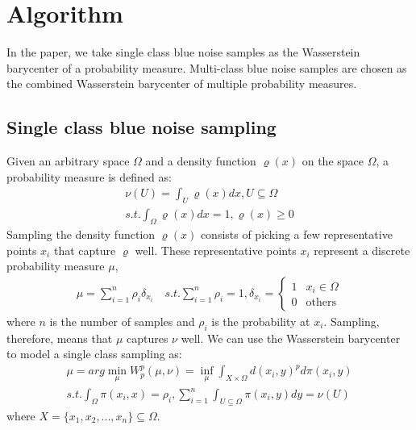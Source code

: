 \section{Algorithm}

In the paper,
we take single class blue noise samples  as the Wasserstein barycenter of a probability measure.
Multi-class blue noise samples are chosen as the combined Wasserstein barycenter of multiple probability measures.
\subsection{Single class blue noise sampling}
Given an arbitrary space $\Omega$ and a density function $\varrho(x)$ on the space $\Omega$,
a probability measure is defined as:
\begin{equation}\label{probability-measure}
  \begin{split}
  \nu(U)=\int_U\varrho(x)dx, U\subseteq\Omega \\
  s.t. \int_{\Omega}\varrho(x)dx=1,\varrho(x)\geq0
  \end{split}
\end{equation}
Sampling the density function $\varrho(x)$ consists of picking a few representative points $x_i$
that capture $\varrho$ well.
These representative points $x_i$ represent a discrete probability measure $\mu$,
\begin{equation*}
\begin{split}
  \mu=\sum\limits_{i=1}^n\rho_i\delta_{x_i} \quad
  s.t. \sum\limits_{i=1}^n\rho_i=1,  \delta_{x_i}= \left\{ \begin{array}{ll}
  1 & x_i\in\Omega\\
  0 & \textrm{others}
  \end{array} \right.
  \end{split}
\end{equation*}
where $n$ is the number of samples and
$\rho_i$ is the probability at $x_i$.
Sampling, therefore, means that $\mu$ captures $\nu$ well.
We can use the Wasserstein barycenter to model a single class sampling as:
\begin{equation}\label{single-class-problem}
\begin{split}
 \mu=arg\min\limits_\mu W_p^p(\mu,\nu)=\inf\limits_\mu\int_{X\times\Omega}d(x_i,y)^pd\pi(x_i,y)\\
 s.t. \int_\Omega\pi(x_i,x)=\rho_i, \sum\limits_{i=1}^n\int_{U\subseteq\Omega}\pi(x_i,y)dy=\nu(U)
 \end{split}
\end{equation}
where $X=\{x_1,x_2,...,x_n\}\subseteq\Omega$.


